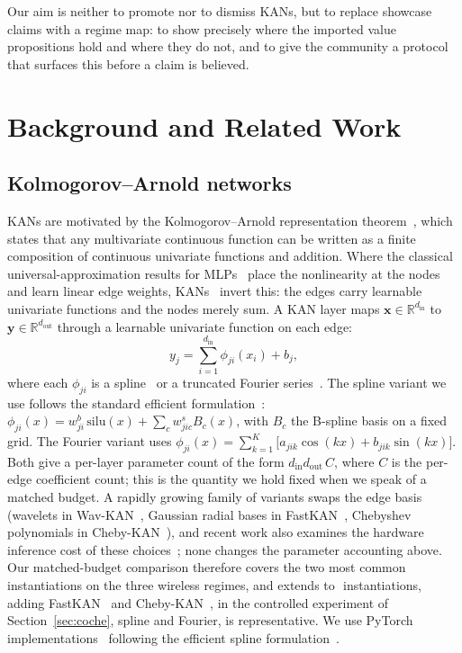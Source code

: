 \documentclass[final,5p,times]{elsarticle}
\begin{document}
Our aim is neither to promote nor to dismiss KANs, but to replace showcase claims with a
regime map: to show precisely where the imported value propositions hold and where they do
not, and to give the community a protocol that surfaces this before a claim is believed.

\section{Background and Related Work}\label{sec:bg}
\subsection{Kolmogorov--Arnold networks}
KANs are motivated by the Kolmogorov--Arnold representation theorem~\cite{kolmogorov1957},
which states that any multivariate continuous function can be written as a finite
composition of continuous univariate functions and addition. Where the classical
universal-approximation results for MLPs~\cite{cybenko1989,hornik1991} place the
nonlinearity at the nodes and learn linear edge weights, KANs~\cite{liu2024kan,liu2024kan2}
invert this: the edges carry learnable univariate functions and the nodes merely sum. A
KAN layer maps $\mathbf{x}\in\mathbb{R}^{d_{\mathrm{in}}}$ to
$\mathbf{y}\in\mathbb{R}^{d_{\mathrm{out}}}$ through a learnable univariate function on
each edge:
\begin{equation}
y_j = \sum_{i=1}^{d_{\mathrm{in}}} \phi_{ji}(x_i) + b_j ,
\end{equation}
where each $\phi_{ji}$ is a spline~\cite{liu2024kan} or a truncated Fourier
series~\cite{efficientkan}. The spline variant we use follows the standard
efficient formulation~\cite{efficientkan}: $\phi_{ji}(x)=w^{b}_{ji}\,\mathrm{silu}(x) +
\sum_{c} w^{s}_{jic} B_c(x)$, with $B_c$ the B-spline basis on a fixed grid. The Fourier
variant uses $\phi_{ji}(x)=\sum_{k=1}^{K}\big[a_{jik}\cos(kx)+b_{jik}\sin(kx)\big]$.
Both give a per-layer parameter count of the form $d_{\mathrm{in}} d_{\mathrm{out}}\,C$,
where $C$ is the per-edge coefficient count; this is the quantity we hold fixed when we
speak of a matched budget. A rapidly growing family of variants swaps the edge basis
(wavelets in Wav-KAN~\cite{wavkan}, Gaussian radial bases in FastKAN~\cite{fastkan},
Chebyshev polynomials in Cheby-KAN~\cite{chebykan}), and recent work also examines the
hardware inference cost of these choices~\cite{hwkan2026}; none changes the parameter
accounting above. Our matched-budget comparison therefore covers the two most common
instantiations on the three wireless regimes, and extends to
$$ instantiations, adding FastKAN~\cite{fastkan} and
Cheby-KAN~\cite{chebykan}, in the controlled experiment of Section~\ref{sec:coche},
spline and Fourier, is representative. We use PyTorch implementations~\cite{paszke2019pytorch}
following the efficient spline formulation~\cite{efficientkan}.
\end{document}
